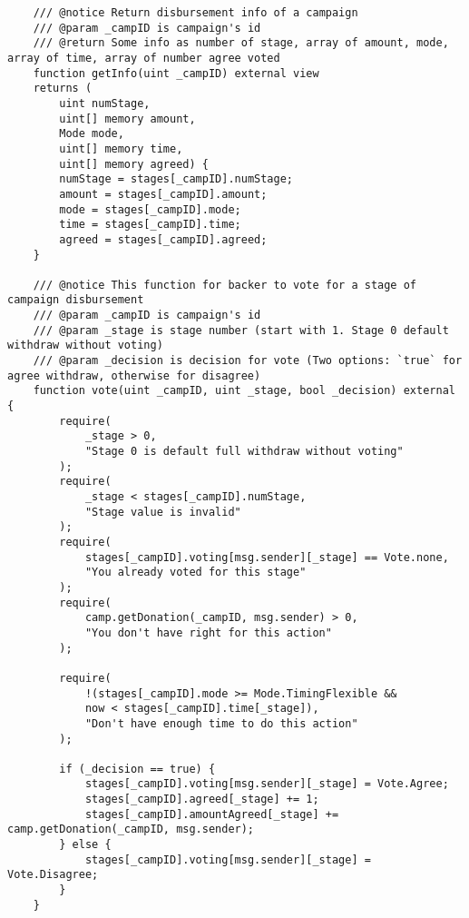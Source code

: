 \documentclass[../main-report.tex]{subfiles}
\begin{document}
\begin{lstlisting}
    /// @notice Return disbursement info of a campaign
    /// @param _campID is campaign's id
    /// @return Some info as number of stage, array of amount, mode, array of time, array of number agree voted
    function getInfo(uint _campID) external view
    returns (
        uint numStage,
        uint[] memory amount,
        Mode mode,
        uint[] memory time,
        uint[] memory agreed) {
        numStage = stages[_campID].numStage;
        amount = stages[_campID].amount;
        mode = stages[_campID].mode;
        time = stages[_campID].time;
        agreed = stages[_campID].agreed;
    }

    /// @notice This function for backer to vote for a stage of campaign disbursement
    /// @param _campID is campaign's id
    /// @param _stage is stage number (start with 1. Stage 0 default withdraw without voting)
    /// @param _decision is decision for vote (Two options: `true` for agree withdraw, otherwise for disagree)
    function vote(uint _campID, uint _stage, bool _decision) external {
        require(
            _stage > 0,
            "Stage 0 is default full withdraw without voting"
        );
        require(
            _stage < stages[_campID].numStage,
            "Stage value is invalid"
        );
        require(
            stages[_campID].voting[msg.sender][_stage] == Vote.none,
            "You already voted for this stage"
        );
        require(
            camp.getDonation(_campID, msg.sender) > 0,
            "You don't have right for this action"
        );

        require(
            !(stages[_campID].mode >= Mode.TimingFlexible &&
            now < stages[_campID].time[_stage]),
            "Don't have enough time to do this action"
        );

        if (_decision == true) {
            stages[_campID].voting[msg.sender][_stage] = Vote.Agree;
            stages[_campID].agreed[_stage] += 1;
            stages[_campID].amountAgreed[_stage] += camp.getDonation(_campID, msg.sender);
        } else {
            stages[_campID].voting[msg.sender][_stage] = Vote.Disagree;
        }
    }


\end{lstlisting}
\end{document}
